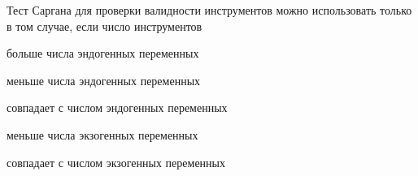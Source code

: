 
\begin{question}
Тест Саргана для проверки валидности инструментов можно использовать
только в том случае, если число инструментов
\begin{answerlist}
  \item больше числа эндогенных переменных
  \item меньше числа эндогенных переменных
  \item совпадает с числом эндогенных переменных
  \item меньше числа экзогенных переменных
  \item совпадает с числом экзогенных переменных
\end{answerlist}
\end{question}


